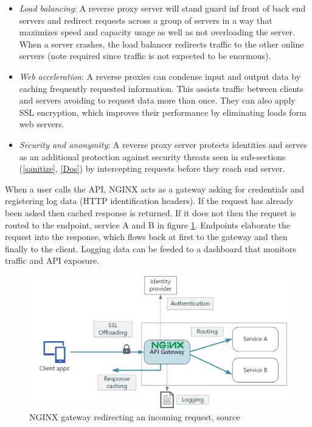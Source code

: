 \documentclass[
  12pt,
  a4paper,
  oneside]{book}
\theoremstyle{definition}
\theoremstyle{definition}
\theoremstyle{definition}
\theoremstyle{remark}
\begin{document}
\begin{itemize}
\item
  \emph{Load balancing}: A reverse proxy server will stand guard inf front of back end servers and redirect requests across a group of servers in a way that maximizes speed and capacity usage as well as not overloading the server. When a server crashes, the load balancer redirects traffic to the other online servers (note required since traffic is not expected to be enormous).
\item
  \emph{Web acceleration}: A reverse proxies can condense input and output data by caching frequently requested information. This assists traffic between clients and servers avoiding to request data more than once. They can also apply SSL encryption, which improves their performance by eliminating loads form web servers.
\item
  \emph{Security and anonymity}: A reverse proxy server protects identities and serves as an additional protection against security threats seen in sub-sections (\ref{sanitize}, \ref{Dos}) by intercepting requests before they reach end server.
\end{itemize}

When a user calls the API, NGINX acts as a gateway asking for credentials and registering log data (HTTP identification headers). If the request has already been asked then cached response is returned. If it does not then the request is routed to the endpoint, service A and B in figure \ref{fig:nginxfun}. Endpoints elaborate the request into the response, which flows back at first to the gateway and then finally to the client. Logging data can be feeded to a dashboard that monitors traffic and API exposure.

\begin{figure}
\centering
\includegraphics{images/nginx_gateway.png}
\caption{\label{fig:nginxfun}NGINX gateway redirecting an incoming request, source \citet{azureNGINX}}
\end{figure}
\end{document}
